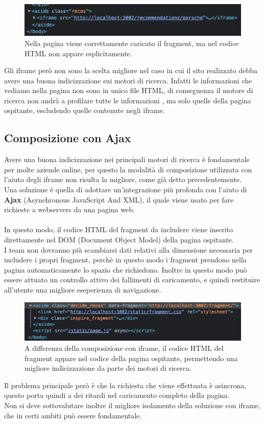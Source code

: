 \begin{figure}[H]
    \centering
    \includegraphics[width=140mm]{img/iframes}
    \caption{Nella pagina viene correttamente caricato il fragment, ma nel codice HTML non appare esplicitamente.}
  \end{figure}
Gli iframe però non sono la scelta migliore nel caso in cui il sito realizzato debba avere una buona indicizzazione sui motori di ricerca.
Infatti le informazioni che vediamo nella pagina non sono in unico file HTML, di conseguenza il motore di ricerca non andrà a profilare tutte le informazioni 
, ma solo quelle della pagina ospitante, escludendo quelle contenute negli iframe.

\subsection{Composizione con Ajax}
Avere una buona indicizzazione nei principali motori di ricerca è fondamentale per molte aziende online, per questo la modalità di 
composizione utilizzata con l'aiuto degli iframe non risulta la migliore, come già detto precedentemente.
\\Una soluzione è quella di adottare un'integrazione più profonda con l'aiuto di \textbf{Ajax} (Asynchronous JavaScript And XML),
il quale viene usato per fare richieste a webservers da una pagina web.
\\\\
In questo modo, il codice HTML del fragment da includere viene inserito direttamente nel DOM (Document Object Model) della pagina ospitante.
\\
I team non dovranno più scambiarsi dati relativi alla dimensione necessaria per includere i propri fragment, perchè in questo modo
i fragment prendono nella pagina automaticamente lo spazio che richiedono. Inoltre in questo modo può essere attuato un controllo attivo 
dei fallimenti di caricamento, e quindi restituire all'utente una migliore eseperienza di navigazione.
\begin{figure}[H]
    \centering
    \includegraphics[width=140mm]{img/ajax}
    \caption{A differenza della composizione con iframe, il codice HTML del fragment appare nel codice della pagina ospitante, permettendo una migliore
    indicizzazione da parte dei motori di ricerca.}
  \end{figure}
Il problema principale però è che la richiesta che viene effettuata è asincrona, questo porta quindi a dei ritardi nel caricamento completo della pagina.
\\
Non si deve sottovalutare inoltre il migliore isolamento della soluzione con iframe, che in certi ambiti può essere fondamentale.

